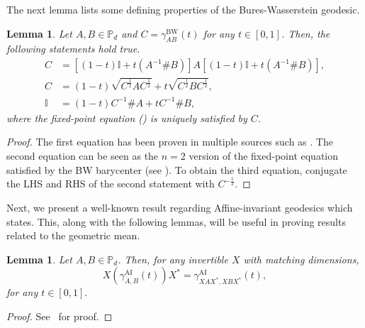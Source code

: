 \documentclass[12pt]{article}
\newtheorem{lemma}[theorem]{Lemma}     %
\theoremstyle{definition}
\begin{document}
The next lemma lists some defining properties of the Bures-Wasserstein geodesic.

\begin{theorembox}
    \begin{lemma} \label{Lem:BWGeodesicProperties}
        Let $A,B \in \mathbb P_d$ and $C = \gamma_{AB}^\mathrm{BW}(t)$ for any $t \in [0,1]$. Then, the following statements hold true.
        \begin{align}
               C &= [(1-t) \mathbb I + t (A^{-1} \# B)]A[(1-t) \mathbb I + t (A ^{-1} \# B)], \\ \label{Eq:161}
             C &= (1-t) \sqrt{C ^{\frac 12} A C ^{\frac 12} } + t \sqrt{C ^{\frac 12} B C ^{\frac 12} }, \\ 
             \mathbb I &= (1-t) C ^{-1} \# A + t C ^{-1} \# B, \label{Eq:162}
        \end{align}
         where the fixed-point equation () is uniquely satisfied by $C$.
    \end{lemma}
\end{theorembox}
\begin{proof}
    The first equation has been proven in multiple sources such as \cite[Equation 39]{bhatia2019bures}. 
    The second equation can be seen as the $n=2$ version of the fixed-point equation satisfied by the BW barycenter (see \cite{afham2022, altschuler2023}). To obtain the third equation, conjugate the LHS and RHS of the second statement with $C ^{-\frac 12} $. \end{proof}

Next, we present a well-known result regarding Affine-invariant geodesics which states. This, along with the following lemmas, will be useful in proving results related to the geometric mean.


\begin{theorembox}
\begin{lemma} \label{Lem:ConjugationInvarianceAI}
Let $A,B \in \mathbb{P}_d$. Then, for any invertible $X$ with matching dimensions,
\begin{equation}
X (\gamma^{\mathrm{AI}}_{A, B} (t)) X^* = \gamma^{\mathrm{AI}}_{X A X^*, X B X^*} (t),
\end{equation}
for any $t \in [0,1].$
\end{lemma}
\end{theorembox}
\begin{proof}
See~\cite[Theorem 5.1 and Remark 5.2]{lawson2024expanding} for proof.    
\end{proof}
\end{document}
